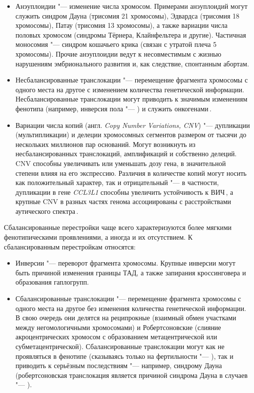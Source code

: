 \documentclass[a4paper,14pt]{extarticle}
\newcommand{\genename}[1]{\textit{#1}}
\newcommand{\ecitep}[1]{\textenglish{\citep{#1}}}
\newcommand{\engterm}[1]{англ. \textenglish{\textit{#1}}}
\begin{document}
\begin{itemize}
	\item Анэуплоидии "--- изменение числа хромосом.
	 Примерами анэуплоидий могут служить синдром Дауна (трисомия 21 хромосомы), Эдвардса (трисомия 18 хромосомы), Патау (трисомия 13 хромосомы), а также вариации числа половых хромосом (синдромы Тёрнера, Клайнфельтера и другие).
	 Частичная моносомия "--- синдром кошачьего крика (связан с утратой плеча 5 хромосомы).
	 Прочие анэуплоидии ведут к несовместимым с жизнью нарушениям эмбрионального развития и, как следствие, спонтанным абортам.
	\item Несбалансированные транслокации "--- перемещение фрагмента хромосомы с одного места на другое с изменением количества генетической информации.
	 Несбалансированные транслокации могут приводить к значимым изменениям фенотипа (например, инверсия пола "--- \citealp{Rizvi_2008}) и служить онкогенами\,\ecitep{O_Connor_2008}.
	\item Вариации числа копий (\engterm{Copy Number Variations, CNV}) "--- дупликации (мультипликации) и делеции хромосомных сегментов размером от тысячи до нескольких миллионов пар оснований.
	 Могут возникнуть из несбалансированных транслокаций, амплификаций и собственно делеций.
	 CNV способны увеличивать или уменьшать дозу гена, в значительной степени влияя на его экспрессию.
	 Различия в количестве копий могут носить как положительный характер, так и отрицательный "--- в частности, дупликации в гене \genename{CCL3L1} способны увеличить устойчивость к ВИЧ\,\ecitep{Gonzalez_2005}, а крупные CNV в разных частях генома ассоциированы с расстройствами аутического спектра\,\ecitep{Sebat_2007}.
\end{itemize}

Сбалансированные перестройки чаще всего характеризуются более мягкими фенотипическими проявлениями, а иногда и их отсутствием.
К сбалансированным перестройкам относятся:

\begin{itemize}
	\item Инверсии "--- переворот фрагмента хромосомы.
	 Крупные инверсии могут быть причиной изменения границы ТАД, а также запирания кроссинговера и образования гаплогрупп.
	\item Сбалансированные транслокации "--- перемещение фрагмента хромосомы с одного места на другое без изменения количества генетической информации.
	 В свою очередь они делятся на реципрокные (взаимный обмен участками между негомологичными хромосомами) и Робертсоновские (слияние акроцентрических хромосом с образованием метацентрической или субметацентрической).
	 Сбалансированные транслокации могут как не проявляться в фенотипе (сказываясь только на фертильности "--- \citealp{Dong_2012}), так и приводить к серьёзным последствиям "--- например, синдрому Дауна (робертсоновская транслокация является причиной синдрома Дауна в  случаев "--- \citealp{Asim_2015}).
\end{itemize}
\end{document}
